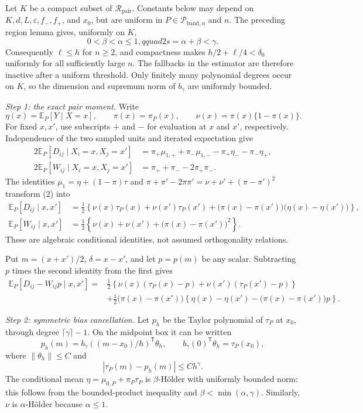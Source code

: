 Let \(K\) be a compact subset of \(\mathcal R_{\mathrm{pair}}\).  Constants
below may depend on \(K,d,L,\varepsilon,f_-,f_+\), and \(x_0\), but are
uniform in \(P\in\mathcal P_{\mathrm{band},n}\) and \(n\).  The preceding
region lemma gives, uniformly on \(K\),
\[
0<\beta<\alpha\leq1,qquad 2s=\alpha+\beta<\gamma.
\tag{1}
\]
Consequently \(\ell\leq h\) for \(n\geq2\), and compactness makes
\(h/2+\ell/4<\delta_0\) uniformly for all sufficiently large \(n\).  The
fallbacks in the estimator are therefore inactive after a uniform threshold.
Only finitely many polynomial degrees occur on \(K\), so the dimension and
supremum norm of \(b_\gamma\) are uniformly bounded.

\emph{Step 1: the exact pair moment.}
Write
\[
\eta(x)=\mathbb E_P[Y\mid X=x],\qquad
\pi(x)=\pi_P(x),\qquad
\nu(x)=\pi(x)\{1-\pi(x)\}.
\]
For fixed \(x,x'\), use subscripts \(+\) and \(-\) for evaluation at
\(x\) and \(x'\), respectively.  Independence of the two sampled units and
iterated expectation give
\[
\begin{aligned}
2\mathbb E_P[D_{ij}\mid X_i=x,X_j=x']
&=\pi_+\mu_{1,+}+\pi_-\mu_{1,-}
-\pi_+\eta_- -\pi_-\eta_+,\\
2\mathbb E_P[W_{ij}\mid X_i=x,X_j=x']
&=\pi_++\pi_- -2\pi_+\pi_-.
\end{aligned}
\tag{2}
\]
The identities
\(\mu_1=\eta+(1-\pi)\tau\) and
\(\pi+\pi'-2\pi\pi'=\nu+\nu'+(\pi-\pi')^2\) transform (2) into
\[
\begin{aligned}
\mathbb E_P[D_{ij}\mid x,x']
&=\frac12\left\{
\nu(x)\tau_P(x)+\nu(x')\tau_P(x')
+\bigl(\pi(x)-\pi(x')\bigr)
\bigl(\eta(x)-\eta(x')\bigr)
\right\},\\
\mathbb E_P[W_{ij}\mid x,x']
&=\frac12\left\{
\nu(x)+\nu(x')+\bigl(\pi(x)-\pi(x')\bigr)^2
\right\}.
\end{aligned}
\tag{3}
\]
These are algebraic conditional identities, not assumed orthogonality
relations.

Put \(m=(x+x')/2\), \(\delta=x-x'\), and let \(p=p(m)\) be any
scalar.  Subtracting \(p\) times the second identity from the first gives
\[
\begin{aligned}
\mathbb E_P[D_{ij}-W_{ij}p\mid x,x']
={}&\frac12\left\{
\nu(x)(\tau_P(x)-p)+\nu(x')(\tau_P(x')-p)
\right\}\\
&+\frac12\bigl(\pi(x)-\pi(x')\bigr)
\left\{
\eta(x)-\eta(x')-\bigl(\pi(x)-\pi(x')\bigr)p
\right\}.
\end{aligned}
\tag{4}
\]

\emph{Step 2: symmetric bias cancellation.}
Let \(p_h\) be the Taylor polynomial of \(\tau_P\) at \(x_0\), through
degree \(\lceil\gamma\rceil-1\).  On the midpoint box it can be written
\[
p_h(m)=b_\gamma((m-x_0)/h)^{\mathsf T}\theta_h,
\qquad
b_\gamma(0)^{\mathsf T}\theta_h=\tau_P(x_0),
\tag{5}
\]
where \(\lVert\theta_h\rVert\leq C\) and
\[
|\tau_P(m)-p_h(m)|\leq Ch^\gamma.
\tag{6}
\]
The conditional mean \(\eta=\mu_{0,P}+\pi_P\tau_P\) is
\(\beta\)-H\"older with uniformly bounded norm: this follows from the
bounded-product inequality and \(\beta<\min(\alpha,\gamma)\).  Similarly,
\(\nu\) is \(\alpha\)-H\"older because \(\alpha\leq1\).

